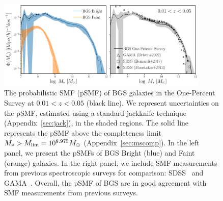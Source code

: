 
\begin{figure}
\begin{center}
    \includegraphics[width=0.9\textwidth]{figs/psmf_bgs_any_comp.pdf} 
    \caption{
        The probabilistic SMF (pSMF) of BGS galaxies in the One-Percent Survey
        at $0.01 < z < 0.05$ (black line). 
        We represent uncertainties on the pSMF, estimated using a standard
        jackknife technique (Appendix~\ref{sec:jack}), in the shaded regions.
        The solid line represents the pSMF above the completeness limit 
        $M_* > M_{\rm lim} = 10^{8.975}M_\odot$ (Appendix~\ref{sec:mscomp}).
        In the left panel, we present the pSMFs of BGS Bright (blue) and
        Faint (orange) galaxies. 
        In the right panel, we include SMF measurements from previous
        spectroscopic surveys for comparison: SDSS~\citep{moustakas2013,
        bernardi2017} and GAMA~\citep{driver2022}. 
        Overall, the pSMF of BGS are in good agreement with SMF
        measurements from previous surveys.  
    }\label{fig:psmf}
\end{center}
\end{figure}

